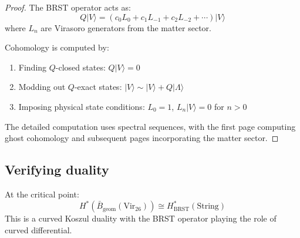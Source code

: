 \begin{proof}
The BRST operator acts as:
\[
Q|V\rangle = \left(c_0L_0 + c_1L_{-1} + c_2L_{-2} + \cdots\right)|V\rangle
\]
where $L_n$ are Virasoro generators from the matter sector.
 
Cohomology is computed by:
\begin{enumerate}
\item Finding $Q$-closed states: $Q|V\rangle = 0$
\item Modding out $Q$-exact states: $|V\rangle \sim |V\rangle + Q|\Lambda\rangle$
\item Imposing physical state conditions: $L_0 = 1$, $L_n|V\rangle = 0$ for $n > 0$
\end{enumerate}
 
The detailed computation uses spectral sequences, with the first page computing ghost cohomology and 
subsequent pages incorporating the matter sector.
\end{proof}
 
\subsection{Verifying duality}
 
\begin{theorem}\label{thm:virasoro-string}
At the critical point:
\[
H^*(\bar{B}_{\mathrm{geom}}(\mathrm{Vir}_{26})) \cong H^*_{\mathrm{BRST}}(\mathrm{String})
\]
This is a curved Koszul duality with the BRST operator playing the role of curved differential.
\end{theorem}

